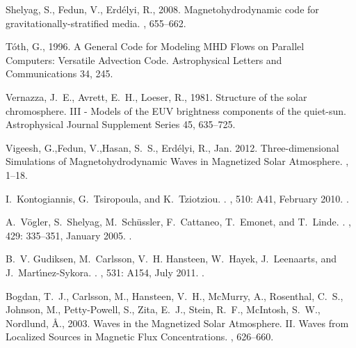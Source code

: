 \documentclass[twocolumn]{aastex62}
\begin{document}
\begin{thebibliography}{}
{Shelyag}, S., {Fedun}, V., {Erd{\'e}lyi}, R., 2008. {Magnetohydrodynamic code
  for gravitationally-stratified media}. , 655--662.

{T{\'o}th}, G., 1996. {A General Code for Modeling {MHD} Flows on Parallel
  Computers: Versatile Advection Code}. Astrophysical Letters and
  Communications 34, 245.

{Vernazza}, J.~E., {Avrett}, E.~H., {Loeser}, R., 1981. {Structure of the solar
  chromosphere. III - Models of the EUV brightness components of the
  quiet-sun}. Astrophysical Journal Supplement Series 45, 635--725.

{Vigeesh}, G.,{Fedun}, V.,{Hasan}, S.~S., {Erd{\'e}lyi}, R.,  Jan. 2012. {Three-dimensional Simulations of Magnetohydrodynamic Waves in Magnetized Solar Atmosphere}. , 1--18.

I.~{Kontogiannis}, G.~{Tsiropoula}, and K.~{Tziotziou}.
.
\newblock \emph{\aap}, 510: A41, February 2010.
\newblock {}.

A.~{V{\"o}gler}, S.~{Shelyag}, M.~{Sch{\"u}ssler}, F.~{Cattaneo}, T.~{Emonet},
  and T.~{Linde}.
.
\newblock \emph{\aap}, 429: 335--351, January 2005.
\newblock {}.

B.~V. {Gudiksen}, M.~{Carlsson}, V.~H. {Hansteen}, W.~{Hayek}, J.~{Leenaarts},
  and J.~{Mart{\'{\i}}nez-Sykora}.
.
\newblock \emph{\aap}, 531: A154, July 2011.
\newblock {}.

{Bogdan}, T.~J., {Carlsson}, M., {Hansteen}, V.~H., {McMurry}, A., {Rosenthal},
  C.~S., {Johnson}, M., {Petty-Powell}, S., {Zita}, E.~J., {Stein}, R.~F.,
  {McIntosh}, S.~W., {Nordlund}, {\AA}., 2003. {Waves in the Magnetized Solar
  Atmosphere. II. Waves from Localized Sources in Magnetic Flux
  Concentrations}. , 626--660.




\end{thebibliography}
\end{document}
